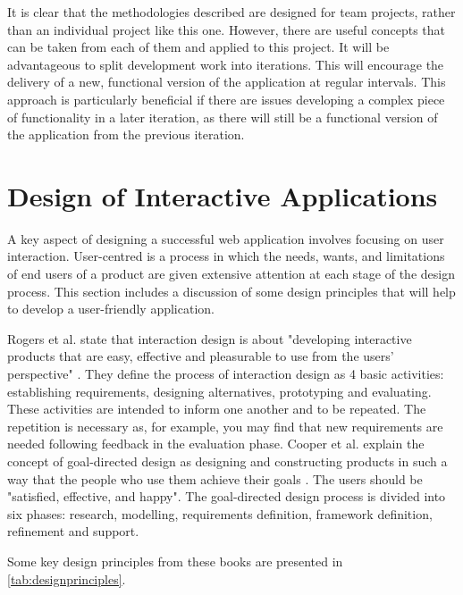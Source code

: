 \documentclass[authoryearcitations]{UoYCSproject}
\begin{document}
It is clear that the methodologies described are designed for team projects, rather than an individual project like this one. However, there are useful concepts that can be taken from each of them and applied to this project. It will be advantageous to split development work into iterations. This will encourage the delivery of a new, functional version of the application at regular intervals. This approach is particularly beneficial if there are issues developing a complex piece of functionality in a later iteration, as there will still be a functional version of the application from the previous iteration. 


\section{Design of Interactive Applications}

A key aspect of designing a successful web application involves focusing on user interaction. User-centred is a process in which the needs, wants, and limitations of end users of a product are given extensive attention at each stage of the design process. This section includes a discussion of some design principles that will help to develop a user-friendly application. 

Rogers et al. state that interaction design is about "developing interactive products that are easy, effective and pleasurable to use from the users' perspective" \citep{Rogers2011}. They define the process of interaction design as 4 basic activities: establishing requirements, designing alternatives, prototyping and evaluating. These activities are intended to inform one another and to be repeated. The repetition is necessary as, for example, you may find that new requirements are needed following feedback in the evaluation phase. Cooper et al. explain the concept of goal-directed design as designing and constructing products in such a way that the people who use them achieve their goals \citep{Cooper2007}. The users should be "satisfied, effective, and happy". The goal-directed design process is divided into six phases: research, modelling, requirements definition, framework definition, refinement and support. 

Some key design principles from these books are presented in \autoref{tab:designprinciples}.
\end{document}
